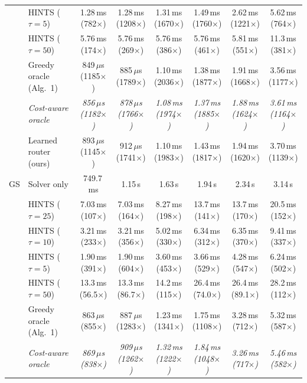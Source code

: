 {\begin{tabular}{llcccccc}
 & HINTS ($\tau{=}5$) & 1.28\,ms (782$\times$) & 1.28\,ms (1208$\times$) & 1.31\,ms (1670$\times$) & 1.49\,ms (1760$\times$) & 2.62\,ms (1221$\times$) & 5.62\,ms (764$\times$) \\
 & HINTS ($\tau{=}50$) & 5.76\,ms (174$\times$) & 5.76\,ms (269$\times$) & 5.76\,ms (386$\times$) & 5.76\,ms (461$\times$) & 5.81\,ms (551$\times$) & 11.3\,ms (381$\times$) \\
 & Greedy oracle (Alg.~1) & 849\,$\mu$s (1185$\times$) & 885\,$\mu$s (1789$\times$) & 1.10\,ms (2036$\times$) & 1.38\,ms (1877$\times$) & 1.91\,ms (1668$\times$) & 3.56\,ms (1177$\times$) \\
 & \textit{Cost-aware oracle} & \textit{856\,$\mu$s (1182$\times$)} & \textit{878\,$\mu$s (1766$\times$)} & \textit{1.08\,ms (1974$\times$)} & \textit{1.37\,ms (1885$\times$)} & \textit{1.88\,ms (1624$\times$)} & \textit{3.61\,ms (1164$\times$)} \\
 & Learned router (ours) & 893\,$\mu$s (1145$\times$) & 912\,$\mu$s (1741$\times$) & 1.10\,ms (1983$\times$) & 1.43\,ms (1817$\times$) & 1.94\,ms (1620$\times$) & 3.70\,ms (1139$\times$) \\
\midrule
GS & Solver only & 749.7\,ms & 1.15\,s & 1.63\,s & 1.94\,s & 2.34\,s & 3.14\,s \\
 & HINTS ($\tau{=}25$) & 7.03\,ms (107$\times$) & 7.03\,ms (164$\times$) & 8.27\,ms (198$\times$) & 13.7\,ms (141$\times$) & 13.7\,ms (170$\times$) & 20.5\,ms (152$\times$) \\
 & HINTS ($\tau{=}10$) & 3.21\,ms (233$\times$) & 3.21\,ms (356$\times$) & 5.02\,ms (330$\times$) & 6.34\,ms (312$\times$) & 6.35\,ms (370$\times$) & 9.41\,ms (337$\times$) \\
 & HINTS ($\tau{=}5$) & 1.90\,ms (391$\times$) & 1.90\,ms (604$\times$) & 3.60\,ms (453$\times$) & 3.66\,ms (529$\times$) & 4.28\,ms (547$\times$) & 6.24\,ms (502$\times$) \\
 & HINTS ($\tau{=}50$) & 13.3\,ms (56.5$\times$) & 13.3\,ms (86.7$\times$) & 14.2\,ms (115$\times$) & 26.4\,ms (74.0$\times$) & 26.4\,ms (89.1$\times$) & 28.2\,ms (112$\times$) \\
 & Greedy oracle (Alg.~1) & 863\,$\mu$s (855$\times$) & 887\,$\mu$s (1283$\times$) & 1.23\,ms (1341$\times$) & 1.75\,ms (1108$\times$) & 3.28\,ms (712$\times$) & 5.32\,ms (587$\times$) \\
 & \textit{Cost-aware oracle} & \textit{869\,$\mu$s (838$\times$)} & \textit{909\,$\mu$s (1262$\times$)} & \textit{1.32\,ms (1222$\times$)} & \textit{1.84\,ms (1048$\times$)} & \textit{3.26\,ms (717$\times$)} & \textit{5.46\,ms (582$\times$)} \\

\end{tabular}}
